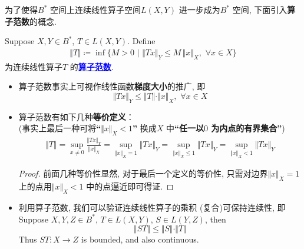 	\vspace*{6em}
	
	\hspace*{-1.95em}为了使得$B^*$ 空间上连续线性算子空间$L(X , Y)$ 进一步成为$B^*$ 空间, 下面引入\textbf{算子范数}的概念. 
	
	\newpage
	
	\begin{defn}\label{def 4.2.1}
		Suppose $X , Y \in B^*$, $T \in L(X , Y)$. Define
		\begin{align*}
			\Vert T \Vert \coloneqq \inf \Big\{ M > 0 \,\, \Big| \,\, \Vert Tx \Vert_Y \leq M \, \Vert x \Vert_X , \,\, \forall x \in X \Big\}
		\end{align*}
		为连续线性算子$T$ 的\underline{\textcolor{blue}{\textbf{算子范数}}}. 
		
		\vspace*{6em}
		
		\begin{rmk}
			\begin{itemize}
				\item 算子范数事实上可视作线性函数\textbf{梯度大小}的推广, 即
				\[ \Vert Tx \Vert_Y \leq \Vert T \Vert \cdot \Vert x \Vert_X , \,\, \forall x \in X \]
				
				\vspace*{6em}
				
				\item 算子范数有如下几种\textbf{等价定义}：\\
				(事实上最后一种可将\textbf{“$\Vert x \Vert_X < 1$”} 换成$X$ 中\textbf{“任一以$0$ 为内点的有界集合”})
				\begin{align*}
					\Vert T \Vert 
					= \sup_{x \neq 0} \frac{\Vert Tx \Vert_Y}{\Vert x \Vert_X} 
					= \sup_{\Vert x \Vert_X = 1} \Vert Tx \Vert_Y 
					= \sup_{\Vert x \Vert_X \leq 1} \Vert Tx \Vert_Y 
					= \sup_{\Vert x \Vert_X < 1} \Vert Tx \Vert_Y
				\end{align*}
				
				\vspace*{1em}
				
				\begin{proof}
					前面几种等价性显然, 对于最后一个定义的等价性, 只需对边界$\Vert x \Vert_X = 1$ 上的点用$\Vert x \Vert_X < 1$ 中的点逼近即可得证. 
				\end{proof}
				
				\vspace*{8em}
				
				\item 利用算子范数, 我们可以验证连续线性算子的乘积 (复合)可保持连续性, 即\\
				Suppose $X , Y , Z \in B^*$, $T \in L(X , Y)$, $S \in L(Y , Z)$, then
				\[ \Vert ST \Vert \leq \Vert S \Vert \cdot \Vert T \Vert \]
				Thus $ST : X \longrightarrow Z$ is bounded, and also continuous. 
				

\end{itemize}
\end{rmk}
\end{defn}
